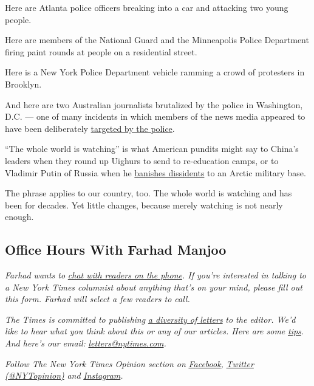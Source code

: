 Here are Atlanta police officers breaking into a car and attacking two
young people.

Here are members of the National Guard and the Minneapolis Police
Department firing paint rounds at people on a residential street.

Here is a New York Police Department vehicle ramming a crowd of
protesters in Brooklyn.

And here are two Australian journalists brutalized by the police in
Washington, D.C. --- one of many incidents in which members of the news
media appeared to have been deliberately
\href{https://www.nytimes.com/2020/06/01/business/media/reporters-protests-george-floyd.html}{targeted
by the police}.

``The whole world is watching'' is what American pundits might say to
China's leaders when they round up Uighurs to send to re-education
camps, or to Vladimir Putin of Russia when he
\href{https://www.nytimes.com/2019/12/24/world/europe/navalny-russia-putin.html}{banishes
dissidents} to an Arctic military base.

The phrase applies to our country, too. The whole world is watching and
has been for decades. Yet little changes, because merely watching is not
nearly enough.

\hypertarget{office-hours-with-farhad-manjoo}{%
\subsection{Office Hours With Farhad
Manjoo}\label{office-hours-with-farhad-manjoo}}

\emph{Farhad wants to}
\href{https://www.nytimes.com/2019/05/16/opinion/farhad-office-hours.html?module=inline}{\emph{chat
with readers on the phone}}\emph{. If you're interested in talking to a
New York Times columnist about anything that's on your mind, please fill
out this form. Farhad will select a few readers to call.}

\emph{The Times is committed to publishing}
\href{https://www.nytimes.com/2019/01/31/opinion/letters/letters-to-editor-new-york-times-women.html}{\emph{a
diversity of letters}} \emph{to the editor. We'd like to hear what you
think about this or any of our articles. Here are some}
\href{https://help.nytimes.com/hc/en-us/articles/115014925288-How-to-submit-a-letter-to-the-editor}{\emph{tips}}\emph{.
And here's our email:}
\href{mailto:letters@nytimes.com}{\emph{letters@nytimes.com}}\emph{.}

\emph{Follow The New York Times Opinion section on}
\href{https://www.facebook.com/nytopinion}{\emph{Facebook}}\emph{,}
\href{http://twitter.com/NYTOpinion}{\emph{Twitter (@NYTopinion)}}
\emph{and}
\href{https://www.instagram.com/nytopinion/}{\emph{Instagram}}\emph{.}

